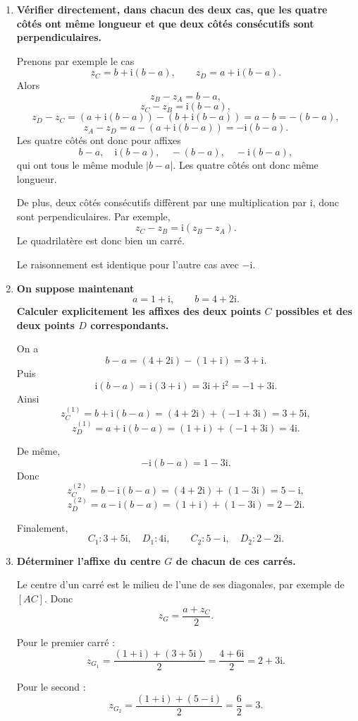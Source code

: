 \documentclass[11pt,a4paper]{article}
\newcommand{\ii}{\mathrm{i}}
\begin{document}
\begin{enumerate}[label=\textbf{\arabic*.}]
    \item \textbf{Vérifier directement, dans chacun des deux cas, que les quatre côtés ont même longueur et que deux côtés consécutifs sont perpendiculaires.}

    Prenons par exemple le cas
    \[
    z_C=b+\ii(b-a),\qquad z_D=a+\ii(b-a).
    \]
    Alors
    \[
    z_B-z_A=b-a,
    \]
    \[
    z_C-z_B=\ii(b-a),
    \]
    \[
    z_D-z_C=(a+\ii(b-a))-(b+\ii(b-a))=a-b=-(b-a),
    \]
    \[
    z_A-z_D=a-(a+\ii(b-a))=-\ii(b-a).
    \]
    Les quatre côtés ont donc pour affixes
    \[
    b-a,\quad \ii(b-a),\quad -(b-a),\quad -\ii(b-a),
    \]
    qui ont tous le même module \(|b-a|\). Les quatre côtés ont donc même longueur.

    De plus, deux côtés consécutifs diffèrent par une multiplication par \(\ii\), donc sont perpendiculaires. Par exemple,
    \[
    z_C-z_B=\ii(z_B-z_A).
    \]
    Le quadrilatère est donc bien un carré.

    Le raisonnement est identique pour l’autre cas avec \(-\ii\).

    \item \textbf{On suppose maintenant
    \[
    a=1+\ii,\qquad b=4+2\ii.
    \]
    Calculer explicitement les affixes des deux points \(C\) possibles et des deux points \(D\) correspondants.}

    On a
    \[
    b-a=(4+2\ii)-(1+\ii)=3+\ii.
    \]
    Puis
    \[
    \ii(b-a)=\ii(3+\ii)=3\ii+\ii^2=-1+3\ii.
    \]
    Ainsi
    \[
    z_C^{(1)}=b+\ii(b-a)=(4+2\ii)+(-1+3\ii)=3+5\ii,
    \]
    \[
    z_D^{(1)}=a+\ii(b-a)=(1+\ii)+(-1+3\ii)=4\ii.
    \]

    De même,
    \[
    -\ii(b-a)=1-3\ii.
    \]
    Donc
    \[
    z_C^{(2)}=b-\ii(b-a)=(4+2\ii)+(1-3\ii)=5-\ii,
    \]
    \[
    z_D^{(2)}=a-\ii(b-a)=(1+\ii)+(1-3\ii)=2-2\ii.
    \]

    Finalement,
    \[
    \boxed{C_1: 3+5\ii,\quad D_1:4\ii,\qquad C_2:5-\ii,\quad D_2:2-2\ii.}
    \]

    \item \textbf{Déterminer l’affixe du centre \(G\) de chacun de ces carrés.}

    Le centre d’un carré est le milieu de l’une de ses diagonales, par exemple de \([AC]\). Donc
    \[
    z_G=\frac{a+z_C}{2}.
    \]

    Pour le premier carré :
    \[
    z_{G_1}=\frac{(1+\ii)+(3+5\ii)}{2}=\frac{4+6\ii}{2}=2+3\ii.
    \]

    Pour le second :
    \[
    z_{G_2}=\frac{(1+\ii)+(5-\ii)}{2}=\frac{6}{2}=3.
    \]


\end{enumerate}
\end{document}

